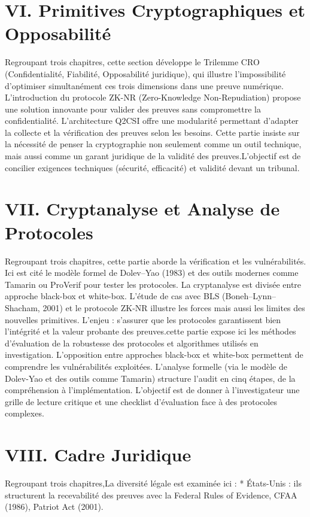 \documentclass[12pt,a4paper]{article}
\begin{document}
	\section*{VI. Primitives Cryptographiques et Opposabilité}
	Regroupant trois chapitres, cette section développe le Trilemme CRO (Confidentialité, Fiabilité, Opposabilité juridique), qui illustre l’impossibilité d’optimiser simultanément ces trois dimensions dans une preuve numérique. L’introduction du protocole ZK-NR (Zero-Knowledge Non-Repudiation) propose une solution innovante pour valider des preuves sans compromettre la confidentialité. L’architecture Q2CSI offre une modularité permettant d’adapter la collecte et la vérification des preuves selon les besoins. Cette partie insiste sur la nécessité de penser la cryptographie non seulement comme un outil technique, mais aussi comme un garant juridique de la validité des preuves.L’objectif est de concilier exigences techniques (sécurité, efficacité) et validité devant un tribunal.
	
	\section*{VII. Cryptanalyse et Analyse de Protocoles}
	Regroupant trois chapitres, cette partie aborde la vérification et les vulnérabilités. Ici est cité le modèle formel de Dolev–Yao (1983) et des outils modernes comme Tamarin ou ProVerif pour tester les protocoles. La cryptanalyse est divisée entre approche black-box et white-box. L’étude de cas avec BLS (Boneh–Lynn–Shacham, 2001) et le protocole ZK-NR illustre les forces mais aussi les limites des nouvelles primitives. L’enjeu : s’assurer que les protocoles garantissent bien l’intégrité et la valeur probante des preuves.cette partie expose ici les méthodes d’évaluation de la robustesse des protocoles et algorithmes utilisés en investigation. L’opposition entre approches black-box et white-box permettent de comprendre les vulnérabilités exploitées. L’analyse formelle (via le modèle de Dolev-Yao et des outils comme Tamarin) structure l’audit en cinq étapes, de la compréhension à l’implémentation. L’objectif est de donner à l’investigateur une grille de lecture critique et une checklist d’évaluation face à des protocoles complexes.
	
	\section*{VIII. Cadre Juridique}
	Regroupant trois chapitres,La diversité légale est examinée ici :
	* États-Unis :	ils structurent la recevabilité des preuves avec la Federal Rules of Evidence, CFAA (1986), Patriot Act (2001).
\end{document}
